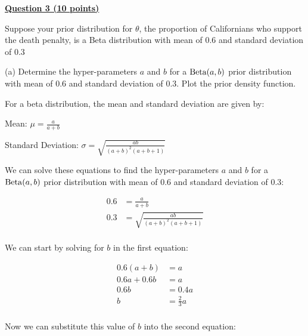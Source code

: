 \documentclass[12pt]{article}
\begin{document}
\bigskip

{\underline{\bf Question 3 (10 points)}}  

Suppose your prior distribution for $\theta$, the proportion of Californians who support the death penalty, is a Beta distribution with mean of 0.6 and standard deviation of 0.3

(a) Determine the hyper-parameters $a$ and $b$ for a ${\rm Beta} (a,b)$ prior distribution with mean of 0.6 and standard deviation of 0.3.  Plot the prior density function.

For a beta distribution, the mean and standard deviation are given by:

Mean: $\mu = \frac{a}{a + b}$

Standard Deviation: $\sigma = \sqrt{\frac{ab}{(a+b)^2(a+b+1)}}$

We can solve these equations to find the hyper-parameters $a$ and $b$ for a ${\rm Beta} (a,b)$ prior distribution with mean of 0.6 and standard deviation of 0.3:

\begin{align*}
0.6 &= \frac{a}{a + b} \\
0.3 &= \sqrt{\frac{ab}{(a+b)^2(a+b+1)}} \\
\end{align*}

We can start by solving for $b$ in the first equation:

\begin{align*}
0.6(a + b) &= a \\
0.6a + 0.6b &= a \\
0.6b &= 0.4a \\
b &= \frac{2}{3}a \\
\end{align*}

Now we can substitute this value of $b$ into the second equation:
\end{document}
